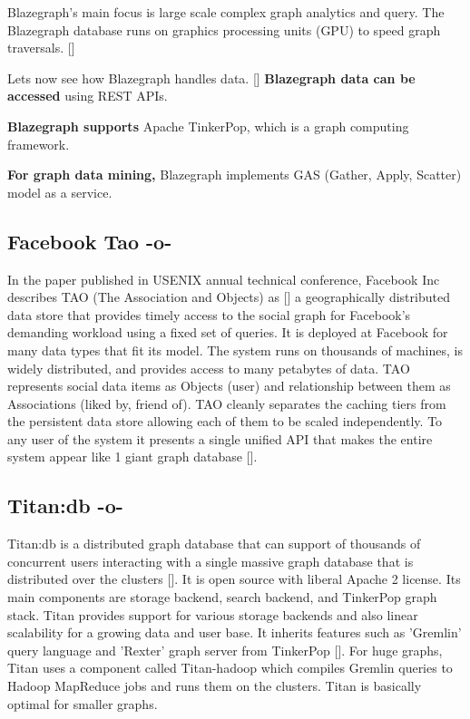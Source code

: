 Blazegraph's main focus is large scale complex graph analytics and
query.  The Blazegraph database runs on graphics processing units
(GPU) to speed graph traversals. [\cite{paper-blzgraph}]

Lets now see how Blazegraph handles data. [\cite{www-blzgraph}] {\bf
Blazegraph data can be accessed} using REST APIs.

{\bf Blazegraph supports} Apache TinkerPop, which is a graph computing
 framework.

{\bf For graph data mining,} Blazegraph implements GAS (Gather, Apply,
Scatter) model as a service.



\subsection{Facebook Tao -o-}

In the paper published in USENIX annual technical conference, Facebook
Inc describes TAO (The Association and Objects) as [\cite{book-tao}] a
geographically distributed data store that provides timely access to
the social graph for Facebook's demanding workload using a fixed set
of queries. It is deployed at Facebook for many data types that fit
its model. The system runs on thousands of machines, is widely
distributed, and provides access to many petabytes of data. TAO
represents social data items as Objects (user) and relationship
between them as Associations (liked by, friend of).  TAO cleanly
separates the caching tiers from the persistent data store allowing
each of them to be scaled independently. To any user of the system it
presents a single unified API that makes the entire system appear like
1 giant graph database [\cite{www-tao}].



\subsection{Titan:db -o-}

Titan:db is a distributed graph database that can support of thousands
of concurrent users interacting with a single massive graph database
that is distributed over the clusters [\cite{www-Titan}]. It is open
source with liberal Apache 2 license. Its main components are storage
backend, search backend, and TinkerPop graph stack. Titan provides
support for various  storage backends and also linear scalability for
a growing data and user base. It inherits features such as 'Gremlin'
query language and 'Rexter' graph server from
TinkerPop [\cite{www-TinkerPop}].  For huge graphs, Titan uses a
component called Titan-hadoop which compiles Gremlin queries to Hadoop
MapReduce jobs and runs them on the clusters. Titan is basically
optimal for smaller graphs.



